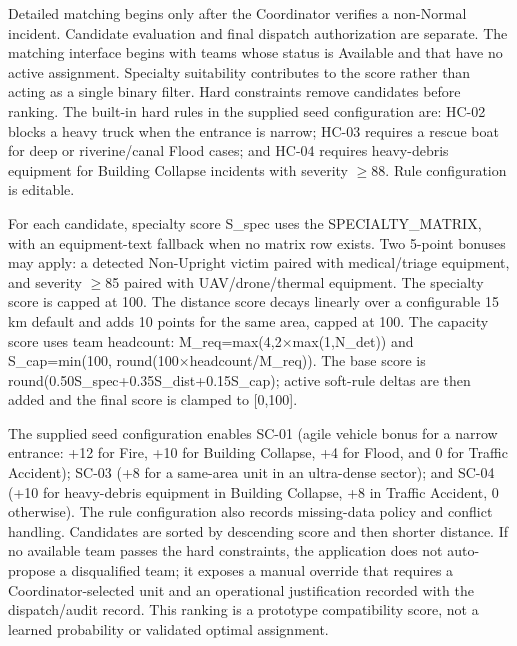 \documentclass[pdflatex,sn-mathphys-ay]{sn-jnl}
\begin{document}
Detailed matching begins only after the Coordinator verifies a non-Normal incident. Candidate evaluation and final dispatch authorization are separate. The matching interface begins with teams whose status is Available and that have no active assignment. Specialty suitability contributes to the score rather than acting as a single binary filter. Hard constraints remove candidates before ranking. The built-in hard rules in the supplied seed configuration are: HC-02 blocks a heavy truck when the entrance is narrow; HC-03 requires a rescue boat for deep or riverine/canal Flood cases; and HC-04 requires heavy-debris equipment for Building Collapse incidents with severity $\geq$88. Rule configuration is editable.

For each candidate, specialty score S\_spec uses the SPECIALTY\_MATRIX, with an equipment-text fallback when no matrix row exists. Two 5-point bonuses may apply: a detected Non-Upright victim paired with medical/triage equipment, and severity $\geq$85 paired with UAV/drone/thermal equipment. The specialty score is capped at 100. The distance score decays linearly over a configurable 15 km default and adds 10 points for the same area, capped at 100. The capacity score uses team headcount: M\_req=max(4,2$\times$max(1,N\_det)) and S\_cap=min(100, round(100$\times$headcount/M\_req)). The base score is round(0.50S\_spec+0.35S\_dist+0.15S\_cap); active soft-rule deltas are then added and the final score is clamped to [0,100].

The supplied seed configuration enables SC-01 (agile vehicle bonus for a narrow entrance: +12 for Fire, +10 for Building Collapse, +4 for Flood, and 0 for Traffic Accident); SC-03 (+8 for a same-area unit in an ultra-dense sector); and SC-04 (+10 for heavy-debris equipment in Building Collapse, +8 in Traffic Accident, 0 otherwise). The rule configuration also records missing-data policy and conflict handling. Candidates are sorted by descending score and then shorter distance. If no available team passes the hard constraints, the application does not auto-propose a disqualified team; it exposes a manual override that requires a Coordinator-selected unit and an operational justification recorded with the dispatch/audit record. This ranking is a prototype compatibility score, not a learned probability or validated optimal assignment.
\vspace{8pt}

\end{document}
